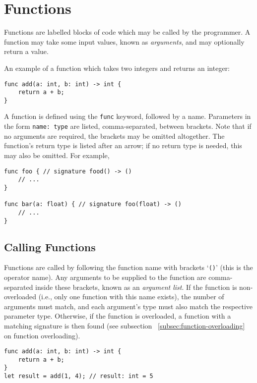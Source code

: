 \section{Functions}\label{sec:functions}

Functions are labelled blocks of code which may be called by the programmer.
A function may take some input values, known as \textit{arguments}, and may optionally return a value.

An example of a function which takes two integers and returns an integer:
\begin{lstlisting}[language=CustomLang]
func add(a: int, b: int) -> int {
    return a + b;
}
\end{lstlisting}

A function is defined using the \texttt{func} keyword, followed by a name.
Parameters in the form \texttt{name: type} are listed, comma-separated, between brackets.
Note that if no arguments are required, the brackets may be omitted altogether.
The function's return type is listed after an arrow; if no return type is needed, this may also be omitted.
For example,
\begin{lstlisting}[language=CustomLang]
func foo { // signature food() -> ()
    // ...
}

func bar(a: float) { // signature foo(float) -> ()
    // ...
}
\end{lstlisting}

\subsection{Calling Functions}

Functions are called by following the function name with brackets `\texttt{()}' (this is the operator name).
Any arguments to be supplied to the function are comma-separated inside these brackets, known as an \textit{argument list}.
If the function is non-overloaded (i.e., only one function with this name exists), the number of arguments must match, and each argument's type must also match the respective parameter type.
Otherwise, if the function is overloaded, a function with a matching signature is then found (see subsection ~\ref{subsec:function-overloading} on function overloading).

\begin{lstlisting}[language=CustomLang]
func add(a: int, b: int) -> int {
    return a + b;
}
let result = add(1, 4); // result: int = 5
\end{lstlisting}

